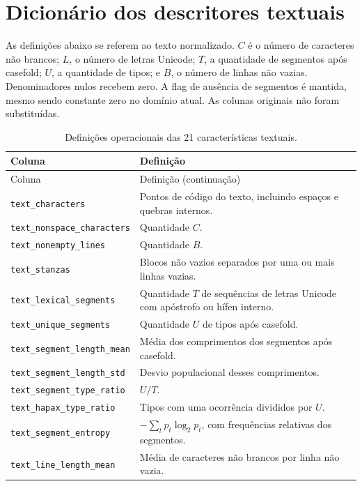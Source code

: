 \chapter{Dicionário dos descritores textuais}\label{ap:descritores}
As definições abaixo se referem ao texto normalizado. $C$ é o número de caracteres não brancos; $L$, o número de letras Unicode; $T$, a quantidade de segmentos após casefold; $U$, a quantidade de tipos; e $B$, o número de linhas não vazias. Denominadores nulos recebem zero. A flag de ausência de segmentos é mantida, mesmo sendo constante zero no domínio atual. As colunas originais não foram substituídas.

\begingroup\small\singlespacing
\begin{longtable}{>{\raggedright\arraybackslash}p{}>{\raggedright\arraybackslash}p{}}
\caption{Definições operacionais das 21 características textuais.}\label{tab:dicionario}\\
\toprule Coluna & Definição \\\midrule\endfirsthead
\toprule Coluna & Definição (continuação) \\\midrule\endhead
\bottomrule\endfoot
\texttt{text\_characters} & Pontos de código do texto, incluindo espaços e quebras internos.\\
\texttt{text\_nonspace\_characters} & Quantidade $C$.\\
\texttt{text\_nonempty\_lines} & Quantidade $B$.\\
\texttt{text\_stanzas} & Blocos não vazios separados por uma ou mais linhas vazias.\\
\texttt{text\_lexical\_segments} & Quantidade $T$ de sequências de letras Unicode com apóstrofo ou hífen interno.\\
\texttt{text\_unique\_segments} & Quantidade $U$ de tipos após casefold.\\
\texttt{text\_segment\_length\_mean} & Média dos comprimentos dos segmentos após casefold.\\
\texttt{text\_segment\_length\_std} & Desvio populacional desses comprimentos.\\
\texttt{text\_segment\_type\_ratio} & $U/T$.\\
\texttt{text\_hapax\_type\_ratio} & Tipos com uma ocorrência divididos por $U$.\\
\texttt{text\_segment\_entropy} & $-\sum_t p_t\log_2p_t$, com frequências relativas dos segmentos.\\
\texttt{text\_line\_length\_mean} & Média de caracteres não brancos por linha não vazia.\\

\end{longtable}

